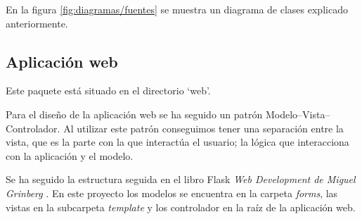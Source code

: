 En la figura \ref{fig:diagramas/fuentes} se muestra un diagrama de clases explicado anteriormente.


\subsection{Aplicación web}

Este paquete está situado en el directorio `web'.

Para el diseño de la aplicación web se ha seguido un patrón Modelo--Vista--Controlador. Al utilizar este patrón conseguimos tener una separación entre la vista, que es la parte con la que interactúa el usuario; la lógica que interacciona con la aplicación y el modelo.


Se ha seguido la estructura seguida en el libro Flask \textit{Web Development de Miguel Grinberg} \cite{book:flask}. En este proyecto los modelos se encuentra en la carpeta \textit{forms}, las vistas en la subcarpeta \textit{template} y los controlador en la raíz de la aplicación web.
